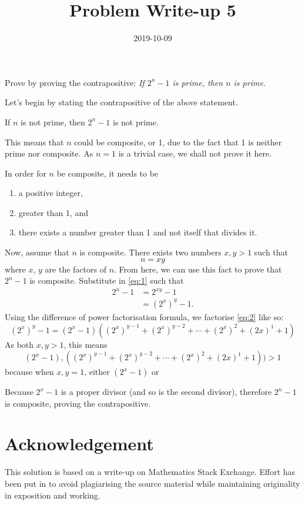 \documentclass[a4paper,12pt]{article}
\title{Problem Write-up 5}
\date{2019-10-09}
\begin{document}
	\begin{problem}
		Prove by proving the contrapositive: \textit{If \(2^n - 1\) is prime, then \(n\) is prime}.
	\end{problem}
	\begin{answer}
		Let's begin by stating the contrapositive of the above statement.
		\begin{indcontrapositive}
			If \(n\) is not prime, then \(2^n - 1\) is not prime.
		\end{indcontrapositive}
		This means that \(n\) could be composite, or 1, due to the fact that 1 is neither prime nor composite. As \(n = 1\) is a trivial case, we shall not prove it here.
		
		In order for \(n\) be composite, it needs to be
		\begin{enumerate}[1.]
			\item a positive integer,
			\item greater than 1, and
			\item there exists a number greater than 1 and not itself that divides it.
		\end{enumerate}
		Now, assume that \(n\) is composite. There exists two numbers \(x,y > 1\) such that 
		\begin{equation} \label{eq:1}
			n = xy
		\end{equation}
		where \(x\), \(y\) are the factors of \(n\). From here, we can use this fact to prove that \(2^n - 1\) is composite. Substitute in \eqref{eq:1} such that
		\begin{align} \label{eq:2}
			2^n - 1 &= 2^{xy} - 1 \nonumber \\
			&= (2^x)^y - 1.
		\end{align}
		Using the difference of power factorisation formula, we factorise \eqref{eq:2} like so:
		\begin{equation}
			(2^x)^y - 1 = (2^x - 1)((2^x)^{y - 1} + (2^x)^{y - 2} + \dotsb + (2^x)^2 + (2x)^1 + 1)
		\end{equation}
		As both \(x,y > 1\), this means \[(2^x - 1),((2^x)^{y - 1} + (2^x)^{y - 2} + \dotsb + (2^x)^2 + (2x)^1 + 1)) > 1\] because when \(x,y = 1\), either \((2^x - 1)\) or 
		
		Because \(2^x - 1\) is a proper divisor (and so is the second divisor), therefore \(2^n - 1\) is composite, proving the contrapositive.
	\end{answer}
	\section*{Acknowledgement}
	This solution is based on a write-up on Mathematics Stack Exchange.\cite{496418} Effort has been put in to avoid plagiarising the source material while maintaining originality in exposition and working.
	
	\printbibliography
\end{document}
